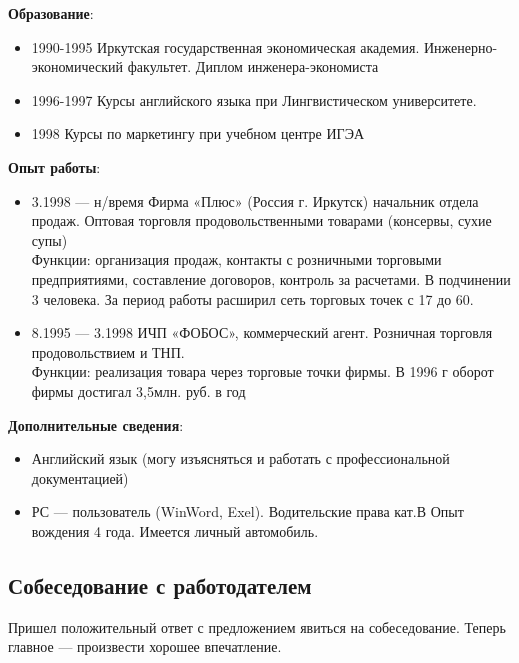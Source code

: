 \textbf{Образование}:

\begin{itemize}[noitemsep, label=--]
    \item 1990-1995 Иркутская государственная экономическая академия. Инженерно-экономический факультет. Диплом инженера-экономиста
    \item 1996-1997 Курсы английского языка при Лингвистическом университете.
    \item 1998 Курсы по маркетингу при учебном центре ИГЭА
\end{itemize}


\textbf{Опыт работы}:

\begin{itemize}[noitemsep, label=--]
    \item 3.1998 --- н/время Фирма «Плюс» (Россия г. Иркутск) начальник отдела продаж.
          Оптовая торговля продовольственными товарами
          (консервы, сухие супы)\\
          Функции: организация продаж, контакты с розничными
          торговыми предприятиями, составление договоров, контроль за
          расчетами. В подчинении 3 человека. За период работы
          расширил сеть торговых точек с 17 до 60.


    \item 8.1995 --- 3.1998 ИЧП «ФОБОС», коммерческий агент.
          Розничная торговля продовольствием и ТНП.\\
          Функции: реализация товара через торговые точки фирмы.
          В 1996 г оборот фирмы достигал 3,5млн. руб. в год
\end{itemize}




\textbf{Дополнительные сведения}:
\begin{itemize}[noitemsep, label=--]
    \item Английский язык (могу изъясняться и работать с профессиональной документацией)
    \item РС --- пользователь (WinWord, Exel). Водительские права кат.В Опыт вождения 4 года. Имеется личный автомобиль.
\end{itemize}




\subsection{Собеседование с работодателем}
Пришел положительный ответ с предложением явиться на собеседование. Теперь главное --- произвести хорошее впечатление.

